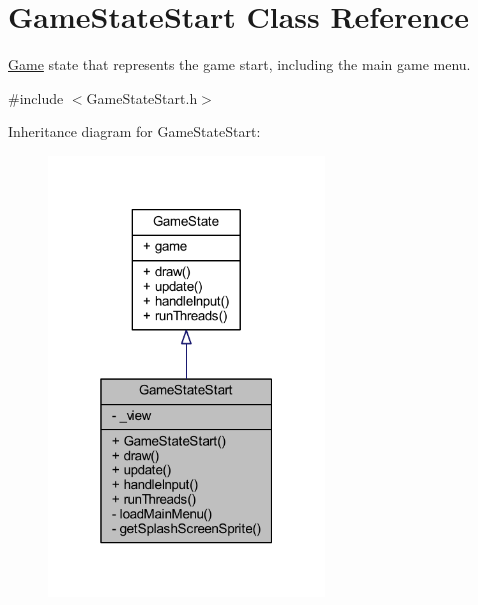 \hypertarget{class_game_state_start}{\section{Game\+State\+Start Class Reference}
\label{class_game_state_start}
}


\hyperlink{class_game}{Game} state that represents the game start, including the main game menu.  




{\ttfamily \#include $<$Game\+State\+Start.\+h$>$}



Inheritance diagram for Game\+State\+Start\+:\nopagebreak
\begin{figure}[H]
\begin{center}
\leavevmode
\includegraphics[width=208pt]{class_game_state_start__inherit__graph}
\end{center}
\end{figure}


